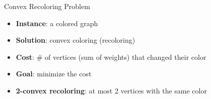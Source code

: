 \begin{frame}{Convex Recoloring Problem}
\begin{itemize}


\item
\textbf{Instance}: a colored graph

\pause\item
\textbf{Solution}: convex coloring (recoloring)

\pause\item
\textbf{Cost}: \# of vertices {\tiny(sum of weights)} that changed their color

\pause\item
\textbf{Goal}: minimize the cost


\end{itemize}
\pause

\begin{itemize}
\pause\item
\textbf{2-convex recoloring}: at most 2 vertices with the same color 
\end{itemize}


\end{frame}
